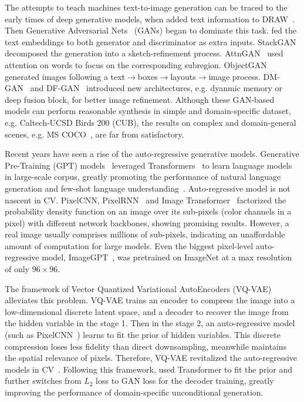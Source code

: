 The attempts to teach machines text-to-image generation can be traced to the early times of deep generative models, when \citet{mansimov2015generating} added text information to DRAW~\cite{gregor2015draw}. Then Generative Adversarial Nets~\cite{goodfellow2014generative} (GANs) began to dominate this task. \citet{reed2016generative} fed the text embeddings to both generator and discriminator as extra inputs. StackGAN~\cite{zhang2017stackgan} decomposed the generation into a sketch-refinement process. AttnGAN~\cite{xu2018attngan} used attention on words to focus on the corresponding subregion. ObjectGAN~\cite{li2019object} generated images following a text$\rightarrow$boxes$\rightarrow$layouts$\rightarrow$image process. DM-GAN~\cite{zhu2019dm} and DF-GAN~\cite{tao2020df} introduced new architectures, e.g. dyanmic memory or deep fusion block, for better image refinement. Although these GAN-based models can perform reasonable synthesis in simple and domain-specific dataset, e.g. Caltech-UCSD Birds 200 (CUB), the results on complex and domain-general scenes, e.g. MS COCO~\cite{lin2014microsoft}, are far from satisfactory.

Recent years have seen a rise of the auto-regressive generative models. Generative Pre-Training (GPT) models~\cite{radford2019language,brown2020language} leveraged Transformers~\cite{vaswani2017attention} to learn language models in large-scale corpus, greatly promoting the performance of natural language generation and few-shot language understanding~\cite{liu2021gpt}. Auto-regressive model is not nascent in CV. PixelCNN, PixelRNN~\cite{van2016pixel} and Image Transformer~\cite{parmar2018image} factorized the probability density function on an image over its sub-pixels (color channels in a pixel) with different network backbones, showing promising results. However, a real image usually comprises millions of sub-pixels, indicating an unaffordable amount of computation for large models. Even the biggest pixel-level auto-regressive model, ImageGPT~\cite{chen2020generative}, was pretrained on ImageNet at a max resolution of only $96\times 96$.  

The framework of Vector Quantized Variational AutoEncoders (VQ-VAE)~\cite{van2017neural} alleviates this problem. VQ-VAE trains an encoder to compress the image into a low-dimensional discrete latent space, and a decoder to recover the image from the hidden variable in the stage 1. Then in the stage 2, an auto-regressive model (such as PixelCNN~\cite{van2016pixel}) learns to fit the prior of hidden variables. This discrete compression loses less fidelity than direct downsampling, meanwhile maintains the spatial relevance of pixels. Therefore, VQ-VAE revitalized the auto-regressive models in CV~\cite{razavi2019generating}. Following this framework, \citet{esser2020taming} used Transformer to fit the prior and further switches from $L_2$ loss to GAN loss for the decoder training, greatly improving the performance of domain-specific unconditional generation.

